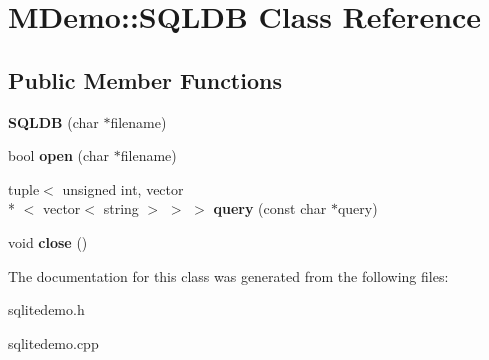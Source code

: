 \hypertarget{class_m_demo_1_1_s_q_l_d_b}{\section{M\-Demo\-:\-:S\-Q\-L\-D\-B Class Reference}
\label{class_m_demo_1_1_s_q_l_d_b}
}
\subsection*{Public Member Functions}
\begin{DoxyCompactItemize}
\item 
\hypertarget{class_m_demo_1_1_s_q_l_d_b_ae7b1ed56a1e8b3d5a187dd6babdbecb6}{{\bfseries S\-Q\-L\-D\-B} (char $\ast$filename)}\label{class_m_demo_1_1_s_q_l_d_b_ae7b1ed56a1e8b3d5a187dd6babdbecb6}

\item 
\hypertarget{class_m_demo_1_1_s_q_l_d_b_afa64d2208de7574486c8b4144d43eda1}{bool {\bfseries open} (char $\ast$filename)}\label{class_m_demo_1_1_s_q_l_d_b_afa64d2208de7574486c8b4144d43eda1}

\item 
\hypertarget{class_m_demo_1_1_s_q_l_d_b_a70dd8fe9e049c6738535aeabec137270}{tuple$<$ unsigned int, vector\\*
$<$ vector$<$ string $>$ $>$ $>$ {\bfseries query} (const char $\ast$query)}\label{class_m_demo_1_1_s_q_l_d_b_a70dd8fe9e049c6738535aeabec137270}

\item 
\hypertarget{class_m_demo_1_1_s_q_l_d_b_a1e13c003c5da5b5851ce4df7bb666d19}{void {\bfseries close} ()}\label{class_m_demo_1_1_s_q_l_d_b_a1e13c003c5da5b5851ce4df7bb666d19}

\end{DoxyCompactItemize}


The documentation for this class was generated from the following files\-:\begin{DoxyCompactItemize}
\item 
sqlitedemo.\-h\item 
sqlitedemo.\-cpp\end{DoxyCompactItemize}
